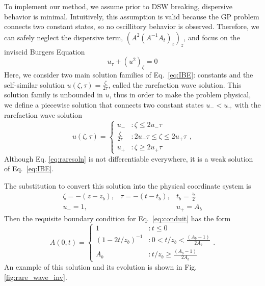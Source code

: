\documentclass{jfm}
\begin{document}
To implement our method, we assume prior to DSW breaking, dispersive behavior is minimal.
Intuitively, this assumption is valid because the GP problem connects two constant states, so no oscillitory behavior is observed.
Therefore, we can safely neglect the dispersive term, $(A^2(A^{-1}A_t)_z)_z$, and focus on the inviscid Burgers Equation
\begin{equation}\label{eq:IBE}
	u_\tau + \left(u^2\right)_\zeta = 0
\end{equation}
Here, we consider two main solution families of Eq.~\ref{eq:IBE}: constants and the self-similar solution $u(\zeta,\tau) =  \frac{\zeta}{2\tau}$, called the rarefaction wave solution.
This solution family is unbounded in $u$, thus in order to make the problem physical, we define a piecewise solution that connects two constant states $u_-<u_+$ with the rarefaction wave solution
\begin{equation}\label{eq:raresoln}
   u(\zeta,\tau) = \begin{cases}
               u_- & : \zeta\le 2u_-\tau  \\
               \frac{\zeta}{2\tau} & : 2u_-\tau \le \zeta \le 2u_+\tau\\
               u_+ & :\zeta\ge 2u_+\tau
            \end{cases},
\end{equation}
Although Eq. \ref{eq:raresoln} is not differentiable everywhere, it is a weak solution of Eq.~\ref{eq:IBE}.

The substitution to convert this solution into the physical coordinate system is
\begin{equation} \label{eq:coordSub1}
\begin{array}{ccc}
    \zeta = -(z-z_b), & \tau = -(t-t_b) ,& t_b = \frac{z_b}{2}\\
    u_- = 1 , &                    &u_+ = A_b
\end{array}
\end{equation}
Then the requisite boundary condition for Eq.~\ref{eq:conduit} has the form
\begin{equation}\label{eq:BCDSW}
   A(0,t) =
     \begin{cases}
       1               & :      t     \le 0                          \\
       (1-2t/z_b)^{-1} & :  0 < t/z_b <   \frac{(A_b - 1)}{2A_b}          \\
       A_b             & :      t/z_b \ge \frac{(A_b - 1)}{2A_b}
     \end{cases}.
\end{equation}
An example of this solution and its evolution is shown in Fig. \ref{fig:rare_wave_inv}.
\end{document}
